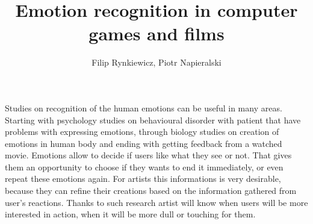 \documentclass[10pt,journal,compsoc,twoside]{IEEEtran}
\begin{document}
\title{Emotion recognition in computer games and films}

\author{Filip Rynkiewicz,
		Piotr Napieralski%
}


%
{}


\maketitle
\IEEEdisplaynontitleabstractindextext
\IEEEpeerreviewmaketitle
{}
Studies on recognition of the human emotions can be useful in many areas. Starting with psychology studies on behavioural disorder with patient that have problems with expressing emotions, through biology studies on creation of emotions in human body and ending with getting feedback from a watched movie. Emotions allow to decide if users like what they see or not. That gives them an opportunity to choose if they wants to end it immediately, or even repeat these emotions again. For artists this informations is very desirable, because they can refine their creations based on the information gathered from user's reactions. Thanks to such research artist will know when users will be more interested in action, when it will be more dull or touching for them. 
\end{document}

